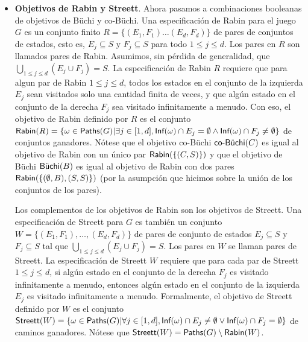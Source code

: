 \begin{itemize}
	\item \textbf{Objetivos de Rabin y Streett}. Ahora pasamos a combinaciones booleanas de objetivos de Büchi y co-Büchi. Una especificación de Rabin para el juego $G$ es un conjunto finito $R = \{(E_1,F_1) \dots (E_d, F_d)\}$ de pares de conjuntos de estados, esto es, $E_j \subseteq S$ y $F_j \subseteq S$ para todo $ 1 \leq j \leq d$. Los pares en $R$ son llamados pares de Rabin. Asumimos, sin pérdida de generalidad, que $\bigcup_{1 \leq j \leq d} (E_j \cup F_j) = S$. La especificación de Rabin $R$ requiere que para algun par de Rabin $1 \leq j \leq d$, todos los estados en el conjunto de la izquierda $E_j$ sean visitados solo una cantidad finita de veces, y que algún estado en el conjunto de la derecha $F_j$ sea visitado infinitamente a menudo. Con eso, el objetivo de Rabin definido por $R$ es el conjunto $\Rabin(R) = \{\omega \in \Paths(G) | \exists j \in [1, d], \Inf(\omega) \cap E_j = \emptyset \wedge \Inf(\omega) \cap F_j \neq \emptyset \}$ de conjuntos ganadores. Nótese que el objetivo co-Büchi $\coBuchi(C)$ es igual al objetivo de Rabin con un único par $\Rabin(\{(C,S)\})$ y que el objetivo de Büchi $\Buchi(B)$ es igual al objetivo de Rabin con dos pares $\Rabin(\{(\emptyset, B), (S,S)\})$ (por la asumpción que hicimos sobre la unión de los conjuntos de los pares).

	      Los complementos de los objetivos de Rabin son los objetivos de Streett. Una
	      especificación de Streett para $G$ es también un conjunto $W = \{(E_1, F_1),
		      \dots, (E_d, F_d)\}$ de pares de conjunto de estados $E_j \subseteq S$ y $F_j
		      \subseteq S$ tal que $\bigcup_{1 \leq j \leq d} (E_j \cup F_j) = S$. Los pares
	      en $W$ se llaman pares de Streett. La especificación de Streett $W$ requiere
	      que para cada par de Streett $1 \leq j \leq d$, si algún estado en el conjunto
	      de la derecha $F_j$ es visitado infinitamente a menudo, entonces algún estado
	      en el conjunto de la izquierda $E_j$ es visitado infinitamente a menudo.
	      Formalmente, el objetivo de Streett definido por $W$ es el conjunto
	      $\Streett(W) = \{\omega \in \Paths(G) | \forall j \in [1,d], \Inf(\omega) \cap
		      E_j \neq \emptyset \vee \Inf(\omega) \cap F_j = \emptyset\}$ de caminos
	      ganadores. Nótese que $\Streett(W) = \Paths(G) \setminus \Rabin(W)$.


\end{itemize}
